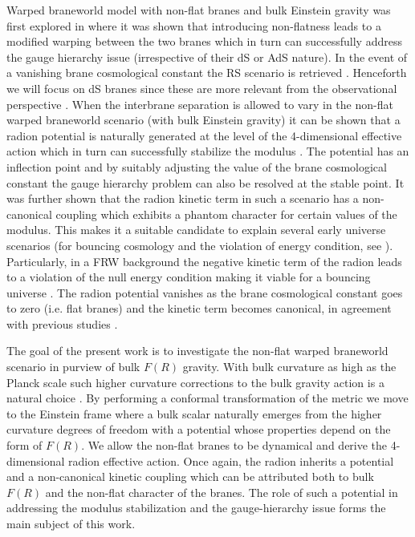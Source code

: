 \documentclass{article}
\begin{document}
Warped braneworld model with non-flat branes and bulk Einstein gravity was first explored in \cite{Das:2007qn} 
where it was shown that introducing non-flatness leads to a modified warping between the two branes which in turn can 
successfully address the gauge hierarchy issue (irrespective  of their dS or AdS nature). 
In the event of a vanishing brane cosmological constant the RS scenario is retrieved . 
Henceforth we will focus on dS branes since these are more relevant from the observational 
perspective \cite{SupernovaCosmologyProject:1998vns,1538-3881-116-3-1009}. When the interbrane separation is allowed to 
vary in the non-flat warped braneworld scenario (with bulk Einstein gravity) it can be shown that a radion potential is 
naturally generated at the level of the 4-dimensional effective action which in turn can successfully stabilize the modulus 
\cite{Banerjee:2017jyk}. The potential has an inflection point and by suitably adjusting the value of the brane cosmological 
constant the gauge hierarchy problem can also be resolved at the stable point. It was further shown that the radion kinetic term in 
such a scenario has a non-canonical coupling which  exhibits a phantom character for certain values of the modulus. 
This makes it a suitable candidate to explain several early universe scenarios \cite{Banerjee:2018kcz,Banerjee:2020uil,Das:2017jrl} 
(for bouncing cosmology and the violation of energy condition, see \cite{Brandenberger:2016vhg,Odintsov:2020zct}). 
Particularly, in a FRW background the negative kinetic term of the radion leads to a violation of the null energy condition making 
it viable for a bouncing universe \cite{Banerjee:2020uil}. The radion potential vanishes as the brane cosmological constant goes 
to zero (i.e. flat branes) and the kinetic term becomes canonical, in agreement with previous studies \cite{GOLDBERGER2000275}.

The goal of the present work is to investigate the non-flat warped braneworld scenario in purview of bulk $F(R)$ gravity. With bulk curvature as high as the Planck scale such higher curvature corrections to the bulk gravity action is a natural choice . By performing a conformal transformation of the metric we move to the Einstein frame where a bulk scalar naturally emerges from the higher curvature degrees of freedom with a potential whose properties depend on the form of $F(R)$. 
We allow the non-flat branes to be dynamical and derive the 4-dimensional radion effective action. Once again, the radion inherits a potential and a non-canonical kinetic coupling which can be attributed both to bulk $F(R)$ and the non-flat character of the branes. The role of such a potential in addressing the modulus stabilization and the gauge-hierarchy issue forms the main subject of this work.
\end{document}
